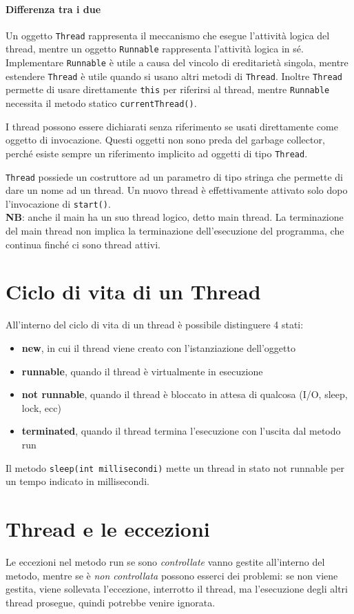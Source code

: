 \paragraph{Differenza tra i due} Un oggetto \texttt{Thread} rappresenta il meccanismo che esegue l'attività logica del thread, mentre un oggetto \texttt{Runnable} rappresenta l'attività logica in sé.
Implementare \texttt{Runnable} è utile a causa del vincolo di ereditarietà singola, mentre estendere \texttt{Thread} è utile quando si usano altri metodi di \texttt{Thread}. Inoltre \texttt{Thread} permette di usare direttamente \texttt{this} per riferirsi al thread, mentre \texttt{Runnable} necessita il metodo statico \texttt{currentThread()}.

I thread possono essere dichiarati senza riferimento se usati direttamente come oggetto di invocazione. Questi oggetti non sono preda del garbage collector, perché esiste sempre un riferimento implicito ad oggetti di tipo \texttt{Thread}.

\texttt{Thread} possiede un costruttore ad un parametro di tipo stringa che permette di dare un nome ad un thread. Un nuovo thread è effettivamente attivato solo dopo l'invocazione di \texttt{start()}. \\
\textbf{NB}: anche il main ha un suo thread logico, detto main thread. La terminazione del main thread non implica la terminazione dell'esecuzione del programma, che continua finché ci sono thread attivi.


\section{Ciclo di vita di un Thread}
All'interno del ciclo di vita di un thread è possibile distinguere 4 stati:
\begin{itemize}
\item \textbf{new}, in cui il thread viene creato con l'istanziazione dell'oggetto
\item \textbf{runnable}, quando il thread è virtualmente in esecuzione
\item \textbf{not runnable}, quando il thread è bloccato in attesa di qualcosa (I/O, sleep, lock, ecc)
\item \textbf{terminated}, quando il thread termina l'esecuzione con l'uscita dal metodo run
\end{itemize}
Il metodo \texttt{sleep(int millisecondi)} mette un thread in stato not runnable per un tempo indicato in millisecondi.

\section{Thread e le eccezioni}
Le eccezioni nel metodo run se sono \textit{controllate} vanno gestite all'interno del metodo, mentre se è \textit{non controllata} possono esserci dei problemi: se non viene gestita, viene sollevata l'eccezione, interrotto il thread, ma l'esecuzione degli altri thread prosegue, quindi potrebbe venire ignorata. 

